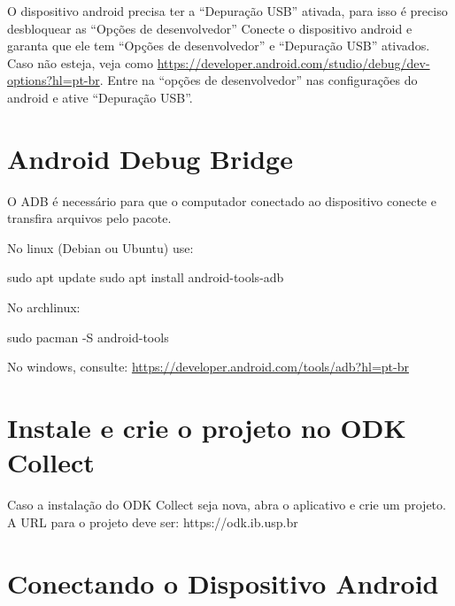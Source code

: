 \documentclass[
  letterpaper,
]{report}
\newenvironment{Shaded}{\begin{snugshade}}{\end{snugshade}}
\newcommand{\AttributeTok}[1]{\textcolor[rgb]{0.40,0.45,0.13}{#1}}
\newcommand{\FunctionTok}[1]{\textcolor[rgb]{0.28,0.35,0.67}{#1}}
\newcommand{\NormalTok}[1]{\textcolor[rgb]{0.00,0.23,0.31}{#1}}
\begin{document}
O dispositivo android precisa ter a ``Depuração USB'' ativada, para isso
é preciso desbloquear as ``Opções de desenvolvedor'' Conecte o
dispositivo android e garanta que ele tem ``Opções de desenvolvedor'' e
``Depuração USB'' ativados. Caso não esteja, veja como
\href{ativar\%20opção\%20de\%20desenvolvedor}{https://developer.android.com/studio/debug/dev-options?hl=pt-br}.
Entre na ``opções de desenvolvedor'' nas configurações do android e
ative ``Depuração USB''.

\section{Android Debug Bridge}\label{android-debug-bridge}

O ADB é necessário para que o computador conectado ao dispositivo
conecte e transfira arquivos pelo pacote.

No linux (Debian ou Ubuntu) use:

\begin{Shaded}
\begin{Highlighting}[]
\FunctionTok{sudo}\NormalTok{ apt update}
\FunctionTok{sudo}\NormalTok{ apt install android{-}tools{-}adb}
\end{Highlighting}
\end{Shaded}

No archlinux:

\begin{Shaded}
\begin{Highlighting}[]
\FunctionTok{sudo}\NormalTok{ pacman }\AttributeTok{{-}S}\NormalTok{ android{-}tools}
\end{Highlighting}
\end{Shaded}

No windows, consulte:
\href{adb}{https://developer.android.com/tools/adb?hl=pt-br}

\section{Instale e crie o projeto no ODK
Collect}\label{instale-e-crie-o-projeto-no-odk-collect}

Caso a instalação do ODK Collect seja nova, abra o aplicativo e crie um
projeto. A URL para o projeto deve ser: https://odk.ib.usp.br

\section{Conectando o Dispositivo
Android}\label{conectando-o-dispositivo-android}
\end{document}
